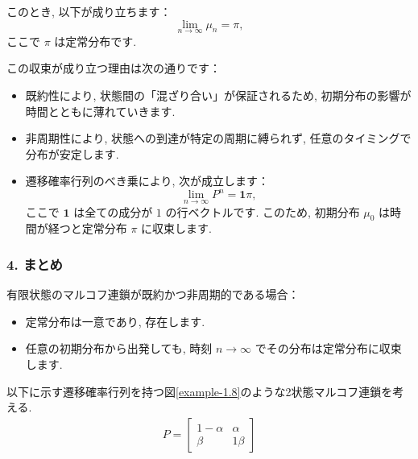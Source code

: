 \documentclass[a4j]{jsarticle}
\begin{document}
{	このとき, 以下が成り立ちます：
	\[
		\lim_{n \to \infty} \mu_n = \pi,
	\]
	ここで $\pi$ は定常分布です.

	この収束が成り立つ理由は次の通りです：
	\begin{itemize}
		\item 既約性により, 状態間の「混ざり合い」が保証されるため, 初期分布の影響が時間とともに薄れていきます.
		\item 非周期性により, 状態への到達が特定の周期に縛られず, 任意のタイミングで分布が安定します.
		\item 遷移確率行列のべき乗により, 次が成立します：
		      \[
			      \lim_{n \to \infty} P^n = \mathbf{1} \pi,
		      \]
		      ここで $\mathbf{1}$ は全ての成分が $1$ の行ベクトルです. このため, 初期分布 $\mu_0$ は時間が経つと定常分布 $\pi$ に収束します.
	\end{itemize}

	\subsubsection*{4. まとめ}
	有限状態のマルコフ連鎖が既約かつ非周期的である場合：
	\begin{itemize}
		\item 定常分布は一意であり, 存在します.
		\item 任意の初期分布から出発しても, 時刻 $n \to \infty$ でその分布は定常分布に収束します.
	\end{itemize}
}

 以下に示す遷移確率行列を持つ図\ref{example-1.8}のような2状態マルコフ連鎖を考える.
\begin{align}
	P = \begin{bmatrix}
		    1-\alpha & \alpha \\
		    \beta    & 1\beta
	    \end{bmatrix}
\end{align}
\end{document}
